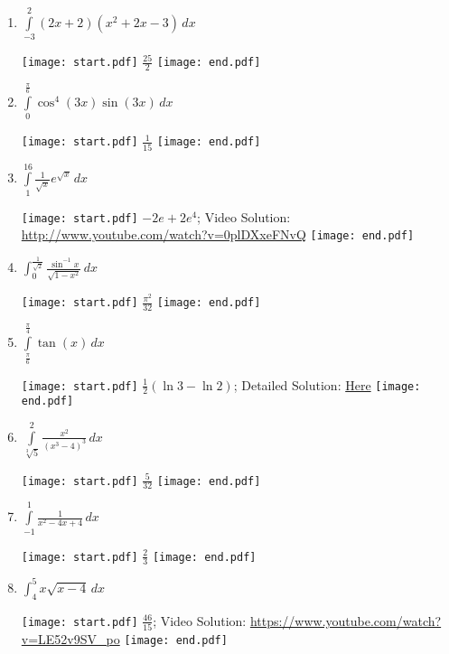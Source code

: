 \documentclass[12pt]{article}
\begin{document}
\begin{enumerate}
\item $\int\limits_{-3}^{2} (2x+2)(x^2+2x-3)\,dx$ 

\texttt{[image: start.pdf]}
{{$\frac{25}{2}$}}
\texttt{[image: end.pdf]}


\item $\int\limits_{0}^{\frac{\pi}{6}} \cos^4{(3x)}\sin{(3x)}\,dx$ 

\texttt{[image: start.pdf]}
{{$\frac{1}{15}$}}
\texttt{[image: end.pdf]}


\item $\int\limits_{1}^{16}\frac{1}{\sqrt{x}}e^{\sqrt{x}}\,dx$ 

\texttt{[image: start.pdf]}
{{$-2e+2e^{4}$; Video Solution: \textcolor{blue}{\href{http://www.youtube.com/watch?v=0plDXxeFNvQ}{http://www.youtube.com/watch?v=0plDXxeFNvQ}}}}
\texttt{[image: end.pdf]}


\item $\int_0^{\frac{1}{\sqrt{2}}} \frac{\sin^{-1}{x}}{\sqrt{1-x^2}} \,dx$

\texttt{[image: start.pdf]}
{{$\frac{\pi^2}{32}$}}
\texttt{[image: end.pdf]}


\item $\int\limits_{\frac{\pi}{6}}^{\frac{\pi}{4}}\tan{(x)}\,dx$ 

\texttt{[image: start.pdf]}
{{$\frac{1}{2}(\ln{3}-\ln{2})$; Detailed Solution: \textcolor{blue}{\href{http://www.math.drexel.edu/classes/Calculus/resources/Math122HW/Solutions/122_06_Substitution_Definite_15.pdf}{Here}}}}
\texttt{[image: end.pdf]}


\item $\int\limits_{\sqrt[3]{5}}^{2}\frac{x^2}{(x^3-4)^3}\,dx$ 

\texttt{[image: start.pdf]}
{{$\frac{5}{32}$}}
\texttt{[image: end.pdf]}


\item $\int\limits_{-1}^{1}\frac{1}{x^2-4x+4}\,dx$ 

\texttt{[image: start.pdf]}
{{$\frac{2}{3}$}}
\texttt{[image: end.pdf]}


\item $\int_4^5 x\sqrt{x-4} \,dx$

\texttt{[image: start.pdf]}
{{$\frac{46}{15}$; Video Solution: \textcolor{blue}{\href{https://www.youtube.com/watch?v=LE52v9SV_po}{https://www.youtube.com/watch?v=LE52v9SV\_po}}}}
\texttt{[image: end.pdf]}



\end{enumerate}
\end{document}
